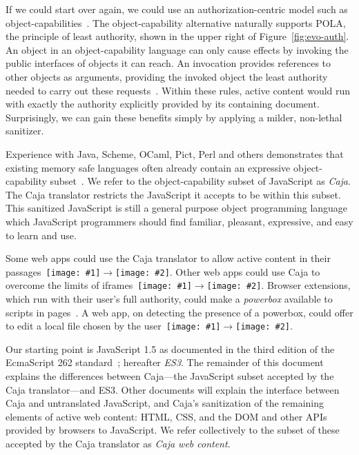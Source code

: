 \documentclass[letterpaper,twocolumn,10pt]{article}
\newcommand{\qq}[2]{{\texttt{[image: \#1]}}$\rightarrow${\texttt{[image: \#2]}}}
\begin{document}
If we could start over again, we could use an authorization-centric model 
such as object-capabilities~\cite{DVH}. The object-capability alternative 
naturally supports POLA, the principle of least authority, shown in the upper 
right of Figure~\ref{fig:evo-auth}. An object in an object-capability 
language can only cause effects by invoking the public interfaces of objects 
it can reach. An invocation provides references to other objects as 
arguments, providing the invoked object the least authority needed to carry 
out these requests~\cite{RobustComposition}. Within these rules, active 
content would run with exactly the authority explicitly provided by its 
containing document. Surprisingly, we can gain these benefits simply by 
applying a milder, non-lethal sanitizer.

Experience with Java, Scheme, OCaml, Pict, Perl and others demonstrates that 
existing memory safe languages often already contain an expressive 
object-capability subset~\cite[respectively]{joe-e, rees96security, emily, 
backwater, caperl}. We refer to the object-capability subset of JavaScript as 
\emph{Caja}. The Caja translator restricts the JavaScript it accepts to be 
within this subset. This sanitized JavaScript is still a general purpose 
object programming language which JavaScript programmers should find 
familiar, pleasant, expressive, and easy to learn and use.

Some web apps could use the Caja translator to allow active content in their 
passages~\qq{1}{5}. Other web apps could use Caja to overcome the limits of 
iframes~\qq{3}{5}. Browser extensions, which run with their user's full 
authority, could make a \emph{powerbox} available to scripts in 
pages~\cite{darpareview, stiegler:polaris, seaborn:plash, bitfrost}. A web 
app, on detecting the presence of a powerbox, could offer to edit a local 
file chosen by the user~\qq{4}{6}.

Our starting point is JavaScript 1.5 as documented in the third edition of 
the EcmaScript 262 standard~\cite{ECMA-262}; hereafter \emph{ES3}. The 
remainder of this document explains the differences between Caja---the 
JavaScript subset accepted by the Caja translator---and ES3. Other documents 
will explain the interface between Caja and untranslated JavaScript, and 
Caja's sanitization of the remaining elements of active web content: HTML, 
CSS, and the DOM and other APIs provided by browsers to JavaScript. We refer 
collectively to the subset of these accepted by the Caja translator as 
\emph{Caja web content}.
\end{document}
